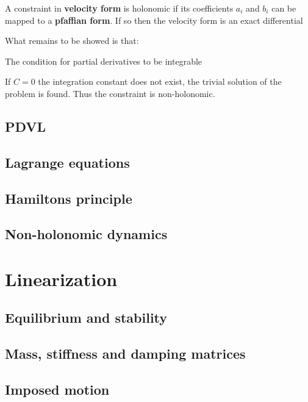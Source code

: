 \documentclass[10pt,a4paper]{scrartcl}
\begin{document}
\begin{multicols*}{2}
A constraint in \textbf{velocity form} is holonomic if its coefficients $a_i$ and $b_i$ can be mapped to a \textbf{pfaffian form}. If so then the velocity form is an exact differential


What remains to be showed is that:


The condition for partial derivatives to be integrable


If $C=0$ the integration constant does not exist, the trivial solution of the problem is found. Thus the constraint is non-holonomic.

\subsection{PDVL}
\subsection{Lagrange equations}
\subsection{Hamiltons principle}
\subsection{Non-holonomic dynamics}
\section{Linearization}
\subsection{Equilibrium and stability}
\subsection{Mass, stiffness and damping matrices}
\subsection{Imposed motion}

\end{multicols*}
\end{document}
